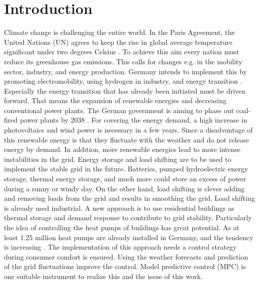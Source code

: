 \chapter{Introduction}
\label{ch:introduction}
Climate change is challenging the entire world. In the Paris Agreement, the United Nations (UN) agrees to keep the rise in global average temperature significant under two degrees Celsius \cite{UnitedNations.2015}. To achieve this aim every nation must reduce its greenhouse gas emissions. This calls for changes e.g. in the mobility sector, industry, and energy production. Germany intends to implement this by promoting electromobility, using hydrogen in industry, and energy transition \cite{Deutschlandfunk.24.06.2021}. Especially the energy transition that has already been initiated must be driven forward. That means the expansion of renewable energies and decreasing conventional power plants. The German government is aiming to phase out coal-fired power plants by 2038 \cite{bundesregierung.2021}. For covering the energy demand, a high increase in photovoltaics and wind power is necessary in a few years. 
\newline
Since a disadvantage of this renewable energy is that they fluctuate with the weather and do not release energy by demand. In addition, more renewable energies lead to more intense instabilities in the grid. Energy storage and load shifting are to be used to implement the stable grid in the future. Batteries, pumped hydroelectric energy storage, thermal energy storage, and much more could store an excess of power during a sunny or windy day. On the other hand, load shifting is clever adding and removing loads from the grid and results in smoothing the grid. Load shifting is already used industrial. A new approach is to use residential buildings as thermal storage and demand response to contribute to grid stability. Particularly the idea of controlling the heat pumps of buildings has great potential. As at least 1.25 million heat pumps are already installed in Germany, and the tendency is increasing \cite{BMW.2021}.
\newline
The implementation of this approach needs a control strategy during consumer comfort is ensured. Using the weather forecasts and prediction of the grid fluctuations improve the control. Model predictive control (MPC) is one suitable instrument to realize this and the issue of this work.

